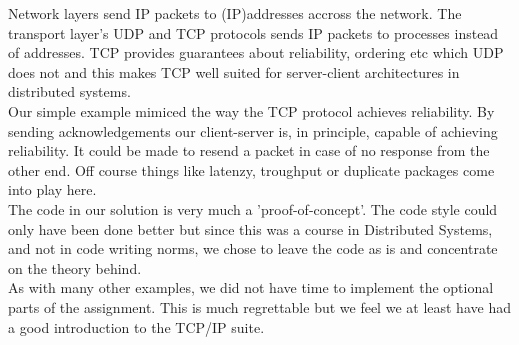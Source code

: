 Network layers send IP packets to (IP)addresses accross the network. The transport layer's UDP and TCP protocols sends IP packets to processes instead of addresses. TCP provides guarantees about reliability, ordering etc which UDP does not and this makes TCP well suited for server-client architectures in distributed systems. \\

Our simple example mimiced the way the TCP protocol achieves reliability. By sending acknowledgements our client-server is, in principle, capable of achieving reliability. It could be made to resend a packet in case of no response from the other end. Off course things like latenzy, troughput or duplicate packages come into play here. \\

The code in our solution is very much a 'proof-of-concept'. The code style could only have been done better but since this was a course in Distributed Systems, and not in code writing norms, we chose to leave the code as is and concentrate on the theory behind.  \\

As with many other examples, we did not have time to implement the optional parts of the assignment. This is much regrettable but we feel we at least have had a good introduction to the TCP/IP suite.


